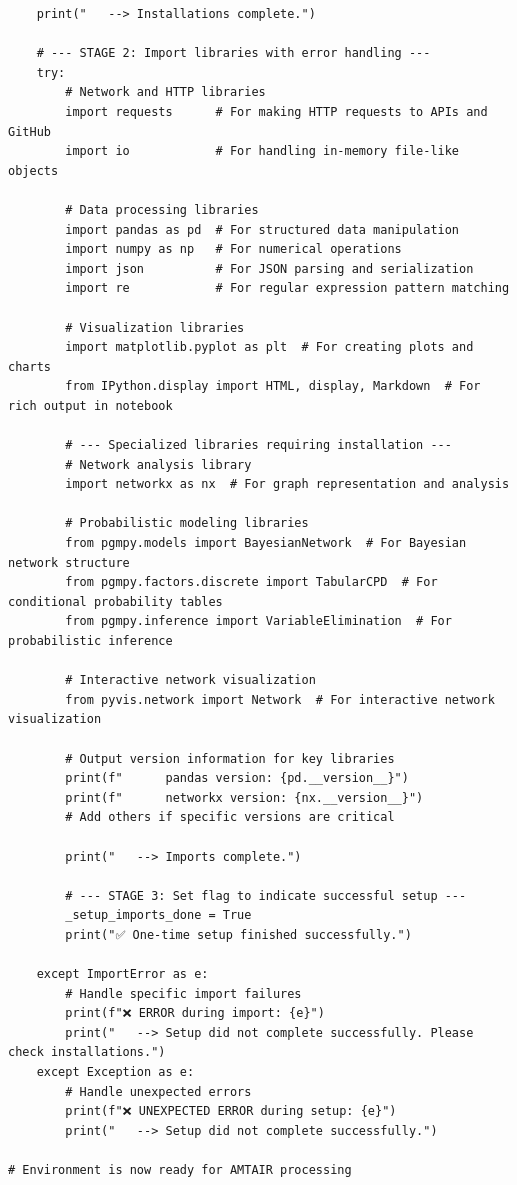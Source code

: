 \documentclass[
  11pt,
  letterpaper,
]{book}
\begin{document}
\begin{verbatim}
    print("   --> Installations complete.")

    # --- STAGE 2: Import libraries with error handling ---
    try:
        # Network and HTTP libraries
        import requests      # For making HTTP requests to APIs and GitHub
        import io            # For handling in-memory file-like objects

        # Data processing libraries
        import pandas as pd  # For structured data manipulation
        import numpy as np   # For numerical operations
        import json          # For JSON parsing and serialization
        import re            # For regular expression pattern matching

        # Visualization libraries
        import matplotlib.pyplot as plt  # For creating plots and charts
        from IPython.display import HTML, display, Markdown  # For rich output in notebook

        # --- Specialized libraries requiring installation ---
        # Network analysis library
        import networkx as nx  # For graph representation and analysis

        # Probabilistic modeling libraries
        from pgmpy.models import BayesianNetwork  # For Bayesian network structure
        from pgmpy.factors.discrete import TabularCPD  # For conditional probability tables
        from pgmpy.inference import VariableElimination  # For probabilistic inference

        # Interactive network visualization
        from pyvis.network import Network  # For interactive network visualization

        # Output version information for key libraries
        print(f"      pandas version: {pd.__version__}")
        print(f"      networkx version: {nx.__version__}")
        # Add others if specific versions are critical

        print("   --> Imports complete.")

        # --- STAGE 3: Set flag to indicate successful setup ---
        _setup_imports_done = True
        print("✅ One-time setup finished successfully.")

    except ImportError as e:
        # Handle specific import failures
        print(f"❌ ERROR during import: {e}")
        print("   --> Setup did not complete successfully. Please check installations.")
    except Exception as e:
        # Handle unexpected errors
        print(f"❌ UNEXPECTED ERROR during setup: {e}")
        print("   --> Setup did not complete successfully.")

# Environment is now ready for AMTAIR processing
\end{verbatim}
\end{document}
